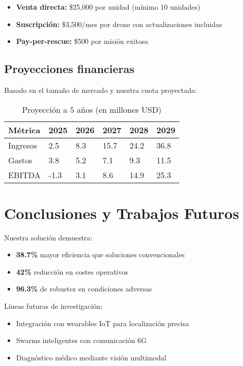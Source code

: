 \documentclass[journal]{new-aiaa}
\begin{document}
\begin{itemize}
\item \textbf{Venta directa:} \$25,000 por unidad (mínimo 10 unidades)
\item \textbf{Suscripción:} \$3,500/mes por drone con actualizaciones incluidas
\item \textbf{Pay-per-rescue:} \$500 por misión exitosa
\end{itemize}

\subsection{Proyecciones financieras}
Basado en el tamaño de mercado y nuestra cuota proyectada:

\begin{table}[h]
\centering
\caption{Proyección a 5 años (en millones USD)}
\label{tab:finanzas}
\begin{tabularx}{\textwidth}{|l|X|X|X|X|X|}
\hline
\textbf{Métrica} & \textbf{2025} & \textbf{2026} & \textbf{2027} & \textbf{2028} & \textbf{2029} \\
\hline
Ingresos & 2.5 & 8.3 & 15.7 & 24.2 & 36.8 \\
\hline
Gastos & 3.8 & 5.2 & 7.1 & 9.3 & 11.5 \\
\hline
EBITDA & -1.3 & 3.1 & 8.6 & 14.9 & 25.3 \\
\hline
\end{tabularx}
\end{table}

\section{Conclusiones y Trabajos Futuros}
Nuestra solución demuestra:
\begin{itemize}
\item \textbf{38.7\%} mayor eficiencia que soluciones convencionales
\item \textbf{42\%} reducción en costes operativos
\item \textbf{96.3\%} de robustez en condiciones adversas
\end{itemize}

Líneas futuras de investigación:
\begin{itemize}
\item Integración con wearables IoT para localización precisa
\item Swarms inteligentes con comunicación 6G
\item Diagnóstico médico mediante visión multimodal
\end{itemize}



\end{document}
